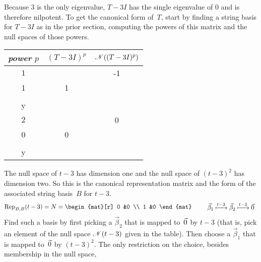 \begin{example}
Because $3$ is the only eigenvalue, 
$T-3I$ has the single eigenvalue of \( 0 \) and is therefore nilpotent.
To get the canonical form of~$T$, start by
finding a string basis for $T-3I$
as in the prior section, computing the powers of this matrix 
and the null spaces of those powers.
\begin{center}
  \begin{tabular}{c|cc}
    \multicolumn{1}{c}{\textit{power} \( p \)}  &\( (T-3I)^p \)  &\( \mathscr{N}((T-3I)^p)  \)   \\  
    \hline
    \( 1 \)
    &\(  
       \matrixvenlarge{\begin{mat}[r]
         -1  &-1 \\
         1   &1   \\
       \end{mat}}  \)
    &\( \set{\matrixvenlarge{\colvec{-y \\ y}}\suchthat
                               y\in\C}  \)   \\
    \( 2 \)
    &\(  
       \matrixvenlarge{\begin{mat}[r]
         0  &0  \\
         0  &0   \\
       \end{mat}}  \)
    &\( \set{\matrixvenlarge{\colvec{x \\ y}}\suchthat
                               x,y\in\C}  \)   \\
  \end{tabular}
\end{center}
The null space of $t-3$ has dimension one
and the null space of $(t-3)^2$ has dimension two.
So this is the canonical representation matrix and the form of the
associated string basis~$B$ for $t-3$.
\begin{equation*}
  \rep{t-3}{B,B}
  =N=
  \begin{mat}[r]
      0  &0   \\
      1  &0
  \end{mat}
  \qquad
  \begin{array}{r}
    \vec{\beta}_1\xmapsto{t-3}\vec{\beta}_2\xmapsto{t-3}\zero  \\
  \end{array}  
\end{equation*}
Find such a basis
by first picking a $\vec{\beta}_2$ that is mapped to~$\vec{0}$
by $t-3$ (that is, pick an element of 
the null space $\mathscr{N}(t-3)$ given in the table).
Then choose a $\vec{\beta}_1$ that is mapped to~$\vec{0}$ by $(t-3)^2$.
The only restriction on the choice, besides membership in the null space,

\end{example}
